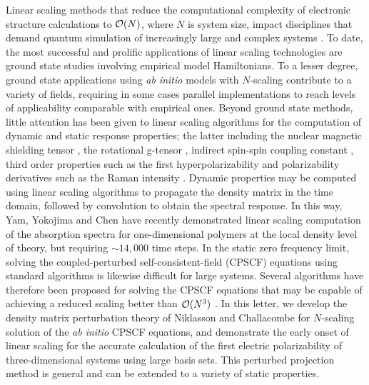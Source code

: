 \documentclass[prl,aps,twocolumn,showpacs,twocolumngrid,superbib]{revtex4}
\begin{document}
Linear scaling methods that reduce the computational complexity of 
electronic structure calculations to ${\cal O}(N)$, where $N$ is system size, 
impact disciplines that demand quantum simulation of increasingly large and complex systems
\cite{GGalli96,DBowler97,SGoedecker99,POrdejon00,VGogonea01,SWu02}. 
To date, the most successful and prolific applications of linear scaling technologies are
ground state studies involving empirical model Hamiltonians.  
To a lesser degree, ground state applications using {\em ab initio} models 
with $N$-scaling contribute to a variety of fields, requiring in some
cases parallel implementations to reach levels of applicability comparable with empirical ones. 
Beyond ground state methods, little attention has been given 
to linear scaling algorithms for the computation of dynamic and static response 
properties; the latter including the nuclear magnetic shielding tensor \cite{Pulay_1990}, 
the rotational g-tensor \cite{Helgaker_1996}, indirect spin-spin coupling constant 
\cite{Pennington_1991,Malkin_1996}, third order  properties such as the first hyperpolarizability 
\cite{Franky_1997} and polarizability derivatives such as the Raman intensity 
\cite{Lazzeri_2003,Champagne_2001}.  Dynamic  properties may be computed using linear scaling algorithms to propagate the density matrix \cite{SNomura97,CYam03} in 
the time domain, followed by convolution to obtain the spectral response.  In this way, 
Yam, Yokojima and Chen \cite{CYam03} have recently demonstrated linear scaling 
computation of the absorption spectra for one-dimensional polymers at the local 
density level of theory, but requiring $\sim 14,000$ time steps.  In the static zero frequency limit, 
solving the coupled-perturbed self-consistent-field (CPSCF) equations using standard algorithms is likewise difficult for
large systems.
Several algorithms have therefore been proposed for solving the CPSCF equations 
that may be capable of achieving a reduced scaling better than ${\cal O}(N^3)$ 
\cite{COchsenfeld97,HLarsen01a}.  In this letter, we develop 
the density matrix perturbation theory of Niklasson and Challacombe 
\cite{ANiklasson04} for $N$-scaling solution of the {\em ab initio} CPSCF equations, and 
demonstrate the early onset of linear scaling for the accurate calculation of the first electric 
polarizability of three-dimensional systems using large basis sets. This perturbed projection 
method is general and can be extended to a variety of static properties.
\end{document}
